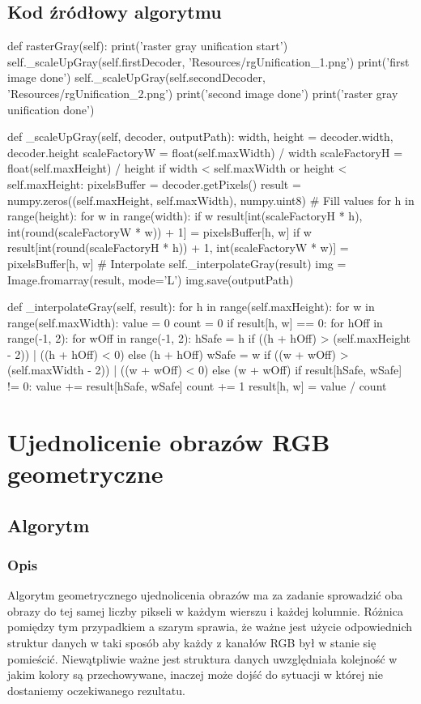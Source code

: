\documentclass[a4paper,12pt]{book}
\begin{document}
\subsection*{Kod źródłowy algorytmu}
\begin{python}
def rasterGray(self):
	print('raster gray unification start')
	self._scaleUpGray(self.firstDecoder, 'Resources/rgUnification_1.png')
	print('first image done')
	self._scaleUpGray(self.secondDecoder, 'Resources/rgUnification_2.png')
	print('second image done')
	print('raster gray unification done')

def _scaleUpGray(self, decoder, outputPath):
	width, height = decoder.width, decoder.height
	scaleFactoryW = float(self.maxWidth) / width
	scaleFactoryH = float(self.maxHeight) / height
	if width < self.maxWidth or height < self.maxHeight:
		pixelsBuffer = decoder.getPixels()
		result = numpy.zeros((self.maxHeight, self.maxWidth), numpy.uint8)
		# Fill values
		for h in range(height):
			for w in range(width):
				if w%
					result[int(scaleFactoryH * h), int(round(scaleFactoryW * w)) + 1] = pixelsBuffer[h, w]
				if w%
					result[int(round(scaleFactoryH * h)) + 1, int(scaleFactoryW * w)] = pixelsBuffer[h, w]
		# Interpolate
		self._interpolateGray(result)
		img = Image.fromarray(result, mode='L')
		img.save(outputPath)

def _interpolateGray(self, result):
	for h in range(self.maxHeight):
		for w in range(self.maxWidth):
			value = 0
			count = 0
			if result[h, w] == 0:
				for hOff in range(-1, 2):
					for wOff in range(-1, 2):
						hSafe = h if ((h + hOff) > (self.maxHeight - 2)) | ((h + hOff) < 0) else (h + hOff)
						wSafe = w if ((w + wOff) > (self.maxWidth - 2)) | ((w + wOff) < 0) else (w + wOff)
						if result[hSafe, wSafe] != 0:
							value += result[hSafe, wSafe]
							count += 1
				result[h, w] = value / count
\end{python}
\section{Ujednolicenie obrazów RGB geometryczne}
\subsection*{Algorytm}
\subsubsection*{Opis}
Algorytm geometrycznego ujednolicenia obrazów ma za zadanie sprowadzić oba obrazy do tej samej liczby pikseli w każdym wierszu i każdej kolumnie. 
Różnica pomiędzy tym przypadkiem a szarym sprawia, że ważne jest użycie odpowiednich struktur danych w taki sposób aby każdy z kanałów RGB był w stanie się pomieścić. Niewątpliwie ważne jest struktura danych uwzględniała kolejność w jakim kolory są przechowywane, inaczej może dojść do sytuacji w której nie dostaniemy oczekiwanego rezultatu. 
\end{document}
